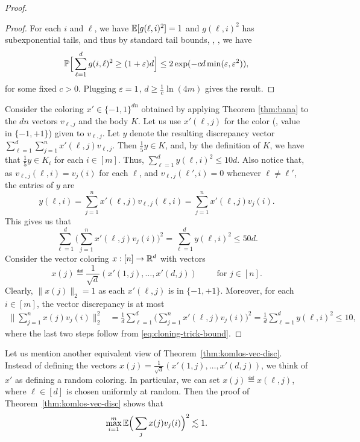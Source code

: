 \begin{proof}
\begin{proof}
  For each $i$ and $\ell$, we have $\mathbb{E}[g(\ell,i)^2]=1$ and $g(\ell,i)^2$ has subexponential tails, and thus by %
 standard tail bounds, \eg, \cite[Corollary 2.8.3]{vershynin}, we have
 \[\mathbb{P}\Big[\sum_{\ell=1}^d g(i,\ell)^2   \geq (1+\varepsilon) d \Big]  \leq  2\exp(- cd \min (\varepsilon,\varepsilon^2)),\]
for some fixed $c>0$. Plugging $\varepsilon=1$, $d \ge \frac{1}{c}
\ln(4m)$ gives the result.
\end{proof}
Consider the coloring $x' \in \{-1,1\}^{dn}$
obtained by applying Theorem \ref{thm:bana}
to the $dn$ vectors $v_{\ell,j}$ and the body $K$. Let us use
$x'(\ell,j)$ for the color (\ie, value in $\{-1, +1\}$) given to
$v_{\ell,j}$.  Let $y$ denote the
resulting discrepancy vector $\sum_{\ell=1}^d\sum_{j = 1}^n x'(\ell,j)
v_{\ell,j}$.
 Then $\frac{1}{5} y \in K$, and, by the definition of $K$, we have
 that  $\frac{1}{5} y \in K_i$ for each $i\in [m]$. Thus, $\sum_{\ell=1}^d y(\ell,i)^2 \leq 10 d$.
 Also notice that, as $v_{\ell,j}(\ell,i) = v_{j}(i)$ for each $\ell$,
 and $v_{\ell,j}(\ell',i) = 0$ whenever $\ell \neq \ell'$, the entries of $y$ are
\[  y(\ell,i)  = \sum_{j=1}^n x'(\ell,j) v_{\ell,j}(\ell,i) =  \sum_{j=1}^n x'(\ell,j) v_{j}(i).\]
This gives us that
\begin{equation}
\label{eq:cloning-trick-bound}
\sum_{\ell=1}^d \Big(\sum_{j=1}^n x'(\ell,j) v_{j} (i)\Big)^2 =
\sum_{\ell=1}^d y(\ell,i)^2  \leq 50 d.
\end{equation}
Consider the vector coloring $x:[n] \to \mathbb{R}^d$ with vectors
\[x(j) \eqdef \frac{1}{\sqrt{d}} (x'(1,j),\ldots,x'(d,j)) \qquad \text{ for $j \in [n]$}.\]
Clearly, $\|x(j)\|_2=1$ as each $x'(\ell,j)$ is in $\{-1,+1\}$. 
Moreover, for each $i\in [m]$, the vector discrepancy is at most  
    \begin{align*}
      \bigg\| \sum_{j=1}^n x(j) v_j(i) \bigg\|_2^2
      & = \frac{1}{d} \sum_{\ell=1}^d \Big( \sum_{j=1}^n x'(\ell,j) v_j(i)\Big)^2   = \frac{1}{d} \sum_{\ell=1}^d  y(\ell,i)^2 \leq 10,  %
         \end{align*}
   where the last two steps follow from \eqref{eq:cloning-trick-bound}.
\end{proof}

Let us mention another equivalent view of
Theorem~\ref{thm:komlos-vec-disc}. Instead of defining the vectors
$x(j) = \frac{1}{\sqrt{d}} (x'(1,j), \ldots, x'(d,j))$, we think of
$x'$ as defining a random coloring. In particular, we can set
$x(j) \eqdef x(\ell,j)$, where $\ell \in [d]$ is chosen uniformly at
random. Then the proof of Theorem~\ref{thm:komlos-vec-disc} shows that
\begin{equation}\label{eq:ch6a-veckomlos-rand}
  \max_{i = 1}^m \mathbb{E}\Big(\sum_{j} x(j) v_j(i)\Big)^2 \lesssim 1.
\end{equation}

